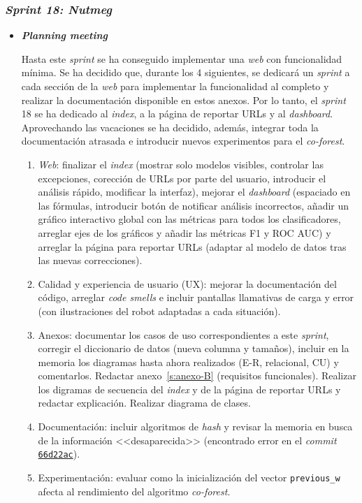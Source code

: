 \subsubsection{\textit{Sprint 18: Nutmeg}}
\begin{itemize}
	\item \textbf{\textit{Planning meeting}}
	
	Hasta este \textit{sprint} se ha conseguido implementar una \textit{web} con funcionalidad mínima. Se ha decidido que, durante los 4 siguientes, se dedicará un \textit{sprint} a cada sección de la \textit{web} para implementar la funcionalidad al completo y realizar la documentación disponible en estos anexos. Por lo tanto, el \textit{sprint} 18 se ha dedicado al \textit{index}, a la página de reportar URLs y al \textit{dashboard}. Aprovechando las vacaciones se ha decidido, además, integrar toda la documentación atrasada e introducir nuevos experimentos para el \textit{co-forest}.
	
	\begin{enumerate}
		\item \textit{Web}: finalizar el \textit{index} (mostrar solo modelos visibles, controlar las excepciones, corección de URLs por parte del usuario, introducir el análisis rápido, modificar la interfaz), mejorar el \textit{dashboard} (espaciado en las fórmulas, introducir botón de notificar análisis incorrectos, añadir un gráfico interactivo global con las métricas para todos los clasificadores, arreglar ejes de los gráficos y añadir las métricas F1 y ROC AUC) y arreglar la página para reportar URLs (adaptar al modelo de datos tras las nuevas correcciones).
		\item Calidad y experiencia de usuario (UX): mejorar la documentación del código, arreglar \textit{code smells} e incluir pantallas llamativas de carga y error (con ilustraciones del robot adaptadas a cada situación).
		\item Anexos: documentar los casos de uso correspondientes a este \textit{sprint}, corregir el diccionario de datos (nueva columna y tamaños), incluir en la memoria los diagramas hasta ahora realizados (E-R, relacional, CU) y comentarlos. Redactar anexo~\ref{s:anexo-B} (requisitos funcionales). Realizar los digramas de secuencia del \textit{index} y de la página de reportar URLs y redactar explicación. Realizar diagrama de clases.
		\item Documentación: incluir algoritmos de \textit{hash} y revisar la memoria en busca de la información <<desaparecida>> (encontrado error en el \textit{commit} \href{https://github.com/phf1001/semisupervised-learning-in-cibersecurity/commit/66d22ac0cf9ffc24385656ae85bf831e03f924be}{\texttt{66d22ac}}).
		\item{Experimentación}: evaluar como la inicialización del vector \texttt{previous\_w} afecta al rendimiento del algoritmo \textit{co-forest}.
		

\end{enumerate}
\end{itemize}
